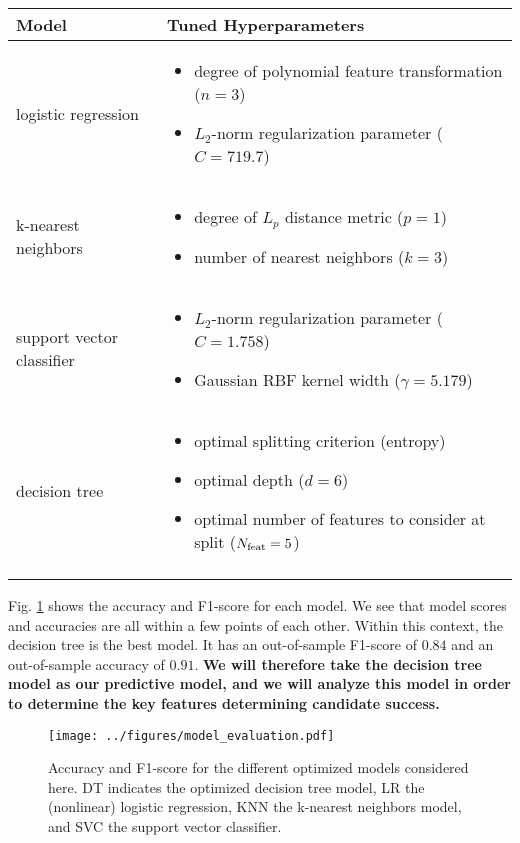 \documentclass[12pt]{article}
\begin{document}
\begin{center}
\begin{tabular}{| l | p{4.5in} |}
{\bf Model} & {\bf Tuned Hyperparameters} \\
\hline
logistic regression & \begin{itemize} \item degree of polynomial feature transformation ($n = 3$) \item $L_2$-norm regularization parameter ($C = 719.7$) \end{itemize} \\
k-nearest neighbors & \begin{itemize} \item degree of $L_p$ distance metric ($p = 1$) \item number of nearest neighbors ($k = 3$) \end{itemize} \\
support vector classifier & \begin{itemize} \item $L_2$-norm regularization parameter ($C = 1.758$) \item Gaussian RBF kernel width ($\gamma = 5.179$) \end{itemize} \\
decision tree & \begin{itemize} \item optimal splitting criterion (entropy) \item optimal depth ($d = 6$) \item optimal number of features to consider at split ($N_{\rm feat} = 5$) \end{itemize} \\
\label{table:models}
\end{tabular}
\end{center}

Fig. \ref{fig:evaluation} shows the accuracy and F1-score for each model. We see that model scores and accuracies are all within a few points of each other. Within this context, the decision tree is the best model. It has an out-of-sample F1-score of $0.84$ and an out-of-sample accuracy of $0.91$. {\bf We will therefore take the decision tree model as our predictive model, and we will analyze this model in order to determine the key features determining candidate success.}

\begin{figure}[H]
    \centerline{\texttt{[image: ../figures/model\_evaluation.pdf]}}
    \caption{Accuracy and F1-score for the different optimized models considered here. DT indicates the optimized decision tree model, LR the (nonlinear) logistic regression, KNN the k-nearest neighbors model, and SVC the support vector classifier.}
    \label{fig:evaluation}
\end{figure}
\end{document}

